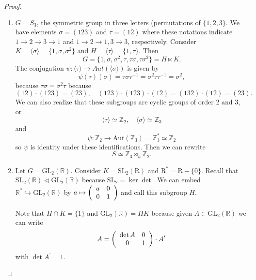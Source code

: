 \begin{proof}
\begin{xmpl}
\begin{enumerate}
  \item{$G = S_3$, the symmetric group in three letters (permutations
      of $\{1,2,3\}$. We have elements $\sigma = (1 2 3)$ and
      $\tau = (1 2)$ where these notations indicate $1 \to 2 \to 3 \to
      1$ and $1 \to 2 \to 1, 3 \to 3$, respectively. Consider
      $K = \langle \sigma \rangle = \{1, \sigma, \sigma^2\}$ and
      $H = \langle \tau \rangle = \{1, \tau\}$. Then
      $$
      G = \{1, \sigma, \sigma^2, \tau, \tau \sigma, \tau \sigma^2\}
        = H \ltimes K.
      $$
      The conjugation
      $\psi : \langle \tau \rangle \to Aut(\langle \sigma \rangle)$
      is given by
      $$
      \psi(\tau)(\sigma) = \tau \sigma \tau^{-1}
                         = \sigma^2 \tau \tau^{-1}
                         = \sigma^2,
      $$
      because $\tau \sigma = \sigma^2 \tau$ because
      $$
      (1 2) \cdot (1 2 3) = (2 3), \quad
      (1 2 3) \cdot (1 2 3) \cdot (1 2)
        = (1 3 2) \cdot (1 2) = (2 3).
      $$
      We can also realize that these subgroups are cyclic
      groups of order 2 and 3, or
      $$
      \langle \tau \rangle \simeq \mathbb{Z}_2, \quad
      \langle \sigma \rangle \simeq \mathbb{Z}_3
      $$
      and
      $$
      \psi : \mathbb{Z}_2
           \to \mathrm{Aut}(\mathbb{Z}_3)
           =   \mathbb{Z}_3^* \simeq \mathbb{Z}_2
      $$
      so $\psi$ is identity under these identifications.
      Then we can rewrite
      $$S \simeq \mathbb{Z}_3 \rtimes_\psi \mathbb{Z}_2.$$
      }
  \item{Let $G = \mathrm{GL}_2(\mathbb{R})$. Consider
        $K = \mathrm{SL}_2(\mathrm{R})$ and
        $\mathrm{R}^* = \mathrm{R} - \{ 0 \}.$
        Recall that
        $\mathrm{SL}_2(\mathbb{R}) \triangleleft
        \mathrm{GL}_2(\mathbb{R})$
        because $\mathrm{SL}_2 = \ker \det$.
        We can embed
        $\mathbb{R}^* \hookrightarrow \mathrm{GL}_2(\mathbb{R})$
        by $a \mapsto \left(\begin{array}{c c} a & 0 \\ 0 &
            1\end{array}\right)$ and call this subgroup $H$.

        Note that $H \cap K = \{ 1 \}$ and
        $\mathrm{GL}_2(\mathbb{R}) = H K$ because
        given $A \in \mathrm{GL}_2(\mathbb{R})$ we can write
        $$
        A = \left(\begin{array}{c c}
              \det A & 0 \\ 0 & 1
            \end{array}\right) \cdot A^\prime
        $$
        with $\det A^\prime = 1$.

}
\end{enumerate}
\end{xmpl}
\end{proof}
